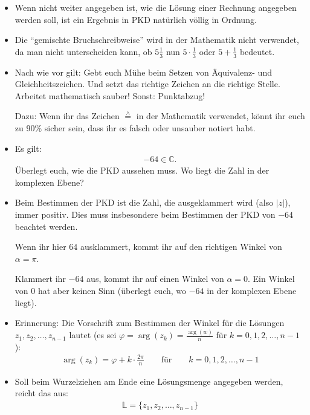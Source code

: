 \documentclass[11pt, a4paper]{article}
\newcommand{\Lsg}{\mathbb{L}}
\newcommand{\C}{\mathbb{C}}
\begin{document}
\begin{itemize}
\item Wenn nicht weiter angegeben ist, wie die Lösung einer Rechnung angegeben werden soll, ist ein Ergebnis in PKD natürlich völlig in Ordnung.

\item Die \enquote{gemischte Bruchschreibweise} wird in der Mathematik nicht verwendet, da man nicht unterscheiden kann, ob $5\frac{1}{3}$ nun $5 \cdot \frac{1}{3}$ oder $5 + \frac{1}{3}$ bedeutet. 

\item Nach wie vor gilt: Gebt euch Mühe beim Setzen von Äquivalenz- und Gleichheitszeichen. Und setzt das richtige Zeichen an die richtige Stelle. Arbeitet mathematisch sauber! Sonst: Punktabzug!

Dazu: Wenn ihr das Zeichen $\stackrel{\wedge}{=}$ in der Mathematik verwendet, könnt ihr euch zu 90\% sicher sein, dass ihr es falsch oder unsauber notiert habt.

\item Es gilt: 
\begin{align*}
-64 \in \C.
\end{align*}
Überlegt euch, wie die PKD aussehen muss. Wo liegt die Zahl in der komplexen Ebene? 

\item Beim Bestimmen der PKD ist die Zahl, die ausgeklammert wird (also $|z|$), immer positiv. Dies muss insbesondere beim Bestimmen der PKD von $-64$ beachtet werden. 

Wenn ihr hier $64$ ausklammert, kommt ihr auf den richtigen Winkel von $\alpha = \pi$. 

Klammert ihr $-64$ aus, kommt ihr auf einen Winkel von $\alpha = 0$. Ein Winkel von $0$ hat aber keinen Sinn (überlegt euch, wo $-64$ in der komplexen Ebene liegt). 

\item Erinnerung: Die Vorschrift zum Bestimmen der Winkel für die Lösungen $z_1, z_2, \dots, z_{n-1}$ lautet (es sei $\varphi = \arg(z_k) = \frac{\arg(w)}{n}$ für $k = 0,1,2,\dots,n-1$):
\begin{align*}
\arg(z_k) = \varphi + k \cdot \frac{2\pi}{n} \qquad\text{für}\qquad k = 0,1,2,\dots,n-1
\end{align*}

\item Soll beim Wurzelziehen am Ende eine Lösungsmenge angegeben werden, reicht das aus:
\begin{align*}
\Lsg = \{z_1, z_2, \dots, z_{n-1}\}
\end{align*}


\end{itemize}
\end{document}
